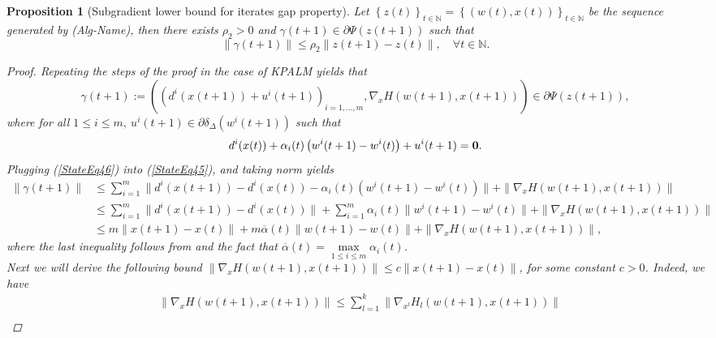 \documentclass[11pt]{article}
\numberwithin{equation}{section}
\newtheorem{proposition}{Proposition}[section]
\begin{document}
\begin{proposition}[Subgradient lower bound for iterates gap property]
Let $\left\lbrace z(t) \right\rbrace_{t \in \mathbb{N}} = \left\lbrace (w(t) , x(t)) \right\rbrace_{t \in \mathbb{N}}$ be the sequence generated by (Alg-Name), then there exists $\rho_2 > 0$ and $\gamma(t+1) \in \partial \Psi(z(t+1))$ such that 
\begin{equation*}
	\| \gamma(t+1)\| \leq \rho_2 \|z(t+1) - z(t)\|, \quad \forall t \in \mathbb{N} .
\end{equation*}

\begin{proof}
Repeating the steps of the proof in the case of KPALM yields that 
\begin{equation}
	\gamma(t+1) := \left( \left( d^i(x(t+1)) + u^i(t+1) \right)_{i=1, \ldots ,m}, \nabla_x H(w(t+1),x(t+1)) \right) \in \partial \Psi(z(t+1)) , \label{StateEq45}
\end{equation}
where for all $1 \leq i \leq m, \: u^i(t+1) \in \partial \delta_{\Delta}(w^i(t+1))$ such that
\begin{equation}
	d^i(x(t)) + \alpha_i(t) \left( w^i(t+1) - w^i(t) \right) + u^i(t+1) = \bf{0} . \label{StateEq46}
\end{equation}
Plugging (\ref{StateEq46}) into (\ref{StateEq45}), and taking norm yields
\begin{equation*}
\begin{aligned}
	\| \gamma(t+1) \|
	&\leq \sum\limits_{i=1}^{m} \| d^i(x(t+1)) - d^i(x(t)) - \alpha_i(t) \left( w^i(t+1) - w^i(t) \right) \| + \| \nabla_x H(w(t+1),x(t+1)) \| \\
	&\leq \sum\limits_{i=1}^{m} \| d^i(x(t+1)) - d^i(x(t)) \| + \sum\limits_{i=1}^{m} \alpha_i(t) \| w^i(t+1) - w^i(t) \| + \| \nabla_x H(w(t+1),x(t+1)) \| \\
	&\leq m \|x(t+1) - x(t)\| + m\overline{\alpha}(t) \|w(t+1) - w(t)\| + \| \nabla_x H(w(t+1),x(t+1)) \|,
\end{aligned}
\end{equation*}
where the last inequality follows from  and the fact that $\overline{\alpha}(t) = \max\limits_{1 \leq i \leq m} \alpha_i(t)$. \\ 
Next we will derive the following bound $\| \nabla_x H(w(t+1),x(t+1)) \| \leq c\|x(t+1) - x(t)\|$, for some constant $c>0$. Indeed, we have
\begin{equation}
\begin{aligned}
	&\| \nabla_x H(w(t+1),x(t+1)) \| \leq \sum\limits_{l=1}^{k} \| \nabla_{x^l} H_l(w(t+1),x(t+1)) \| \\

\end{aligned}
\end{equation}
\end{proof}
\end{proposition}
\end{document}
